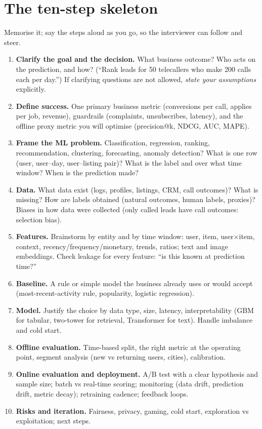 \section{The ten-step skeleton}
Memorise it; say the steps aloud as you go, so the interviewer can follow and steer.
\begin{enumerate}
\item \textbf{Clarify the goal and the decision.} What business outcome? Who acts on the prediction, and how? (``Rank leads for 50 telecallers who make 200
  calls each per day.'') If clarifying questions are not allowed, \emph{state your assumptions} explicitly.
\item \textbf{Define success.} One primary business metric (conversions per call, applies per job, revenue), guardrails (complaints, unsubscribes, latency), and the
  offline proxy metric you will optimise (precision@k, NDCG, AUC, MAPE).
\item \textbf{Frame the ML problem.} Classification, regression, ranking, recommendation, clustering, forecasting, anomaly detection? What is one row (user,
  user--day, user--listing pair)? What is the label and over what time window? When is the prediction made?
\item \textbf{Data.} What data exist (logs, profiles, listings, CRM, call outcomes)? What is missing? How are labels obtained (natural outcomes, human labels, proxies)?
  Biases in how data were collected (only called leads have call outcomes: selection bias).
\item \textbf{Features.} Brainstorm by entity and by time window: user, item, user$\times$item, context, recency/frequency/monetary, trends, ratios; text and image
  embeddings. Check leakage for every feature: ``is this known at prediction time?''
\item \textbf{Baseline.} A rule or simple model the business already uses or would accept (most-recent-activity rule, popularity, logistic regression).
\item \textbf{Model.} Justify the choice by data type, size, latency, interpretability (GBM for tabular, two-tower for retrieval, Transformer for text). Handle
  imbalance and cold start.
\item \textbf{Offline evaluation.} Time-based split, the right metric at the operating point, segment analysis (new vs returning users, cities), calibration.
\item \textbf{Online evaluation and deployment.} A/B test with a clear hypothesis and sample size; batch vs real-time scoring; monitoring (data drift, prediction
  drift, metric decay); retraining cadence; feedback loops.
\item \textbf{Risks and iteration.} Fairness, privacy, gaming, cold start, exploration vs exploitation; next steps.
\end{enumerate}

